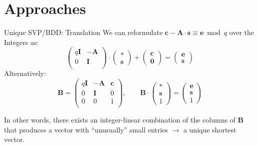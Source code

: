 \documentclass[table,10pt,aspectratio=169]{beamer}
\renewcommand{\vec}[1]{\ensuremath{\mathbf{#1}}\xspace}
\begin{document}
\section{Approaches}
\label{sec:orgcfca367}
\begin{frame}[label={sec:org2acb716}]{Unique SVP/BDD: Translation}
We can reformulate \(\vec{c} - \mathbf{A} \cdot \vec{s} \equiv \vec{e} \bmod q\)  over the Integers as:
\[
  \begin{pmatrix}
    q\mathbf{I} & -\mathbf{A}\\
    0 & \mathbf{I}\\
  \end{pmatrix} \cdot
  \begin{pmatrix}
    \mathbf{*}\\
    \mathbf{s}
  \end{pmatrix} +
  \begin{pmatrix}
    \vec{c}\\
    \vec{0}
  \end{pmatrix} = 
  \begin{pmatrix}
    \vec{e}\\
    \vec{s}
  \end{pmatrix}
\]
Alternatively:
\[
  \mathbf{B} = \begin{pmatrix}
    q\mathbf{I} & -\mathbf{A} & \vec{c}\\
    0 & \mathbf{I} & 0\\
    0 & 0 & 1\\
  \end{pmatrix}, \qquad
  \mathbf{B} \cdot
  \begin{pmatrix}
    \vec{*}\\
    \vec{s}\\
    1
  \end{pmatrix} = 
  \begin{pmatrix}
    \vec{e}\\
    \vec{s}\\
    1
  \end{pmatrix}
\]

In other words, there exists an integer-linear combination of the columns of \(\mathbf{B}\) that produces a vector with “unusually” small entries \(\rightarrow\) a unique shortest vector.
\end{frame}
\end{document}
